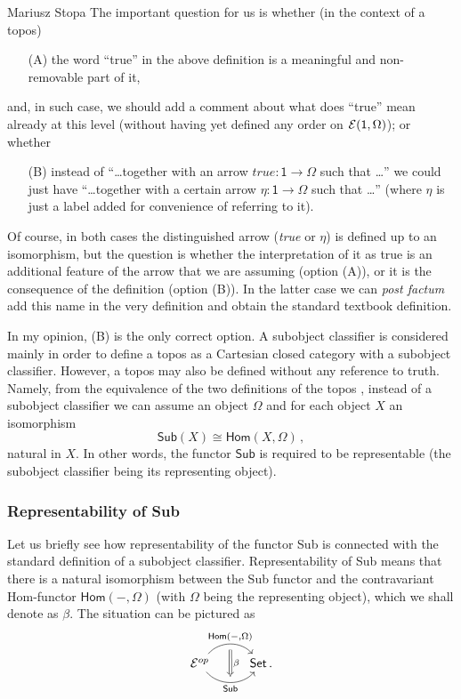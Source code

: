 \begin{artengenv}{Mariusz Stopa}
\noindent The important question for us is whether (in the context of a topos)
\begin{enumerate}
	\item[(A)] the word ``true'' in the above definition is a meaningful and non-removable part of it,
\end{enumerate}
and, in such case, we should add a comment about what does ``true'' mean already at this level (without having yet defined any order on $ \mathcal{E}(\textsf{1},\Omega) $); or whether
\begin{enumerate}
	\item[(B)]\label{opcje} instead of ``\ldots together with an arrow $ \textit{true}: \textsf{1} \to \Omega $ such that \ldots'' we could just have ``\ldots together with a certain arrow $\eta: \textsf{1} \to \Omega $ such that \ldots'' (where $ \eta $ is just a label added for convenience of referring to it).
\end{enumerate}  
Of course, in both cases the distinguished arrow (\textit{true} or $ \eta $) is defined up to an isomorphism, but the question is whether the interpretation of it as true is an additional feature of the arrow that we are assuming (option (A)), or it is the consequence of the definition (option (B)). In the latter case we can \textit{post factum} add this name in the very definition and obtain the standard textbook definition.


In my opinion, (B) is the only correct option. A subobject classifier is considered mainly in order to define a topos as a Cartesian closed category with a subobject classifier. However, a topos may also be defined without any reference to truth. Namely, from the equivalence of the two definitions of the topos \parencite[p.161f and 163]{maclane-moerdijk-1994}, instead of a subobject classifier we can assume an object $ \Omega $ and for each object $ X $ an isomorphism 
\[
\textsf{Sub}(X) \cong \textsf{Hom}(X, \Omega) \, ,
\]
natural in $ X $. In other words, the functor $ \textsf{Sub} $ is required to be representable (the subobject classifier being its representing object).

\subsubsection{Representability of \textsf{Sub}}

Let us briefly see how representability of the functor \textsf{Sub} is connected with the standard definition of a subobject classifier. Representability of \textsf{Sub} means that there is a natural isomorphism between the \textsf{Sub} functor and the contravariant \textsf{Hom}-functor $ \textsf{Hom}(-,\Omega) $ (with $ \Omega $ being the representing object), which we shall denote as $ \beta $. The situation can be pictured as
\begin{equation}\label{natur}
\begin{tikzcd}
\mc{E}^{op} \arrow[r, bend left=50, ""{name=U, below}, "{\textsf{Hom}\left(-,\Omega\right)}"]
\arrow[r, bend right=50, ""{name=D}, "\textsf{Sub}"']
& \textsf{Set}
\arrow[Rightarrow, from=U, to=D,"\beta"]  \, .
\end{tikzcd}
\end{equation}


\end{artengenv}
